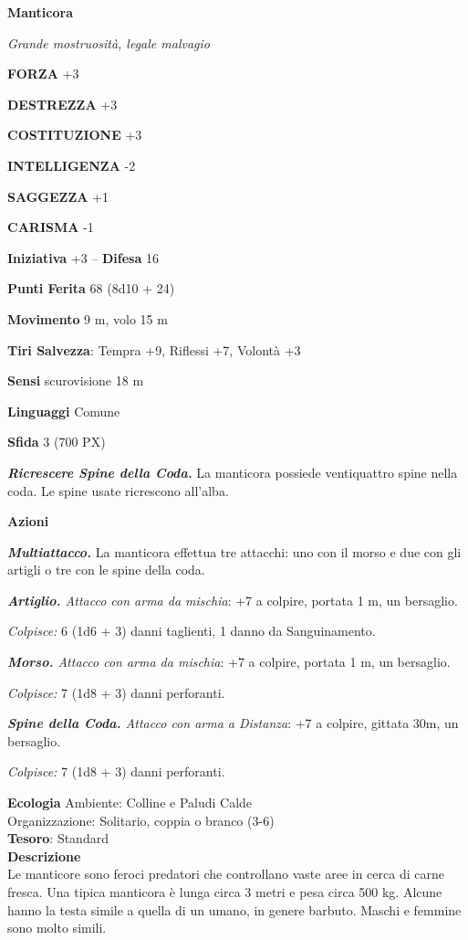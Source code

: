 \begin{multicols}{2}
\medskip{}\textbf{Manticora}

\textit{Grande mostruosità, legale malvagio}

\textbf{FORZA} +3

\textbf{DESTREZZA} +3

\textbf{COSTITUZIONE} +3

\textbf{INTELLIGENZA} -2

\textbf{SAGGEZZA} +1

\textbf{CARISMA} -1

\textbf{Iniziativa} +3 -- \textbf{Difesa} 16

\textbf{Punti Ferita} 68 (8d10 + 24)

\textbf{Movimento} 9 m, volo 15 m

\textbf{Tiri Salvezza}: Tempra +9, Riflessi +7, Volontà +3

\textbf{Sensi} scurovisione 18 m

\textbf{Linguaggi} Comune

\textbf{Sfida} 3 (700 PX)

\textit{\textbf{Ricrescere Spine della Coda.}} La manticora possiede ventiquattro spine nella coda. Le spine usate ricrescono all'alba.

\textbf{Azioni}

\textit{\textbf{Multiattacco.}} La manticora effettua tre attacchi: uno con il morso e due con gli artigli o tre con le spine della coda.

\textit{\textbf{Artiglio.} Attacco con arma da mischia}: +7 a colpire, portata 1 m, un bersaglio.

\textit{Colpisce:} 6 (1d6 + 3) danni taglienti, 1 danno da Sanguinamento.

\textit{\textbf{Morso.} Attacco con arma da mischia}: +7 a colpire, portata 1 m, un bersaglio.

\textit{Colpisce:} 7 (1d8 + 3) danni perforanti.

\textit{\textbf{Spine della Coda.} Attacco con arma a Distanza}: +7 a colpire, gittata 30m, un bersaglio.

\textit{Colpisce:} 7 (1d8 + 3) danni perforanti.

\textbf{Ecologia}
Ambiente: Colline e Paludi Calde\\
Organizzazione: Solitario, coppia o branco (3-6)\\
\textbf{Tesoro}: Standard\\

\textbf{Descrizione}\\
Le manticore sono feroci predatori che controllano vaste aree in cerca di carne fresca. Una tipica manticora è lunga circa 3 metri e pesa circa 500 kg. Alcune hanno la testa simile a quella di un umano, in genere barbuto. Maschi e femmine sono molto simili.


\end{multicols}
